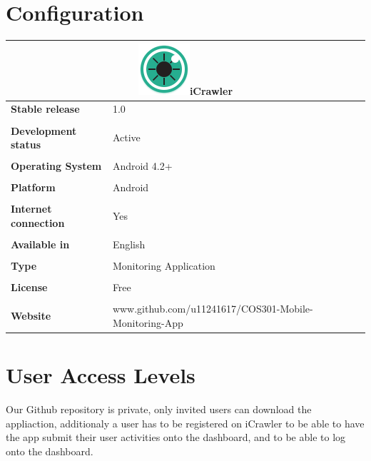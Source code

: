 \documentclass[hidelinks, 12pt, oneside]{article}
\begin{document}
	
	\section{Configuration}
	
	\begin{tabular}{ |l|l| }  \multicolumn{2}{|c|}{\includegraphics[width=0.1 \textwidth]{img/icon.png}iCrawler}
	 \\ \hline\noalign{\smallskip} \textbf{Stable release} & 1.0
	  \\\\ \noalign{\smallskip} \textbf{Development status}& Active
	  \\\\ \noalign{\smallskip}\textbf{Operating System}& Android 4.2+
	  \\\\ \noalign{\smallskip}\textbf{Platform}& Android
	  \\\\ \noalign{\smallskip}\textbf{Internet connection} & Yes
	  \\\\ \noalign{\smallskip}\textbf{Available in} & English
	  \\\\ \noalign{\smallskip}\textbf{Type}& Monitoring Application
	  \\\\ \noalign{\smallskip}\textbf{License}& Free
	  \\\\ \noalign{\smallskip}\textbf{Website}& www.github.com/u11241617/COS301-Mobile-Monitoring-App
	 \end{tabular}\newpage
	\section{User Access Levels}
		Our Github repository is private, only invited users can download the appliaction, additionaly a user has  to be registered on iCrawler to be able to have the app submit their user activities onto the dashboard, and to be able to log onto the dashboard.\newline
\end{document}

